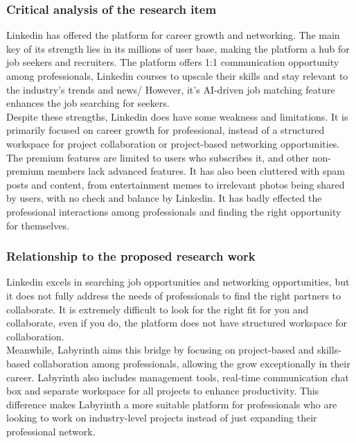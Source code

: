 \documentclass{FastFyp}
\begin{document}
\subsubsection{Critical analysis of the research item}
Linkedin has offered the platform for career growth and networking. The main key of its strength lies in its millions of user base, making the platform a hub for job seekers and recruiters. The platform offers 1:1 communication opportunity among professionals, Linkedin courses to upscale their skills and stay relevant to the industry's trends and news/ However, it's AI-driven job matching feature enhances the job searching for seekers. \\
Despite these strengths, Linkedin does have some weakness and limitations. It is primarily focused on career growth for professional, instead of a structured workspace for project collaboration or project-based networking opportunities. The premium features are limited to users who subscribes it, and other non-premium members lack advanced features. It has also been cluttered with spam posts and content, from entertainment memes to irrelevant photos being shared by users, with no check and balance by Linkedin. It has badly effected the professional interactions among professionals and finding the right opportunity for themselves.
\subsubsection{Relationship to the proposed research work}
Linkedin excels in searching job opportunities and networking opportunities, but it does not fully address the needs of professionals to find the right partners to collaborate. It is extremely difficult to look for the right fit for you and collaborate, even if you do, the platform does not have structured workspace for collaboration. \\ Meanwhile, Labyrinth aims this bridge by focusing on project-based and skills-based collaboration among professionals, allowing the grow exceptionally in their career. Labyrinth also includes management tools, real-time communication chat box and separate workspace for all projects to enhance productivity. This difference makes Labyrinth a more suitable platform for professionals who are looking to work on industry-level projects instead of just expanding their professional network.
\end{document}
